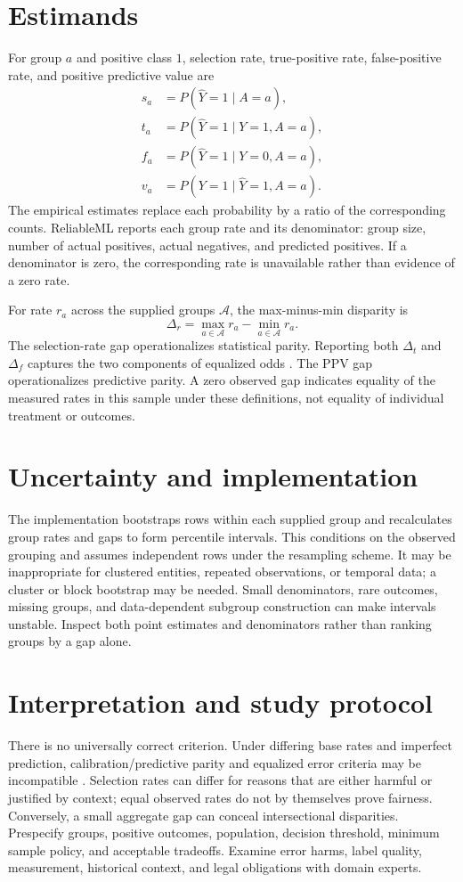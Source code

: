 \documentclass[conference]{IEEEtran}
\begin{document}
\section{Estimands}
For group \(a\) and positive class \(1\), selection rate, true-positive rate, false-positive rate, and positive predictive value are
\[
\begin{aligned}
s_a&=P(\widehat Y=1\mid A=a),\\
t_a&=P(\widehat Y=1\mid Y=1,A=a),\\
f_a&=P(\widehat Y=1\mid Y=0,A=a),\\
v_a&=P(Y=1\mid\widehat Y=1,A=a).
\end{aligned}
\]
The empirical estimates replace each probability by a ratio of the corresponding counts. ReliableML reports each group rate and its denominator: group size, number of actual positives, actual negatives, and predicted positives. If a denominator is zero, the corresponding rate is unavailable rather than evidence of a zero rate.

For rate \(r_a\) across the supplied groups \(\mathcal A\), the max-minus-min disparity is
\[
\Delta_r=\max_{a\in\mathcal A}r_a-\min_{a\in\mathcal A}r_a.
\]
The selection-rate gap operationalizes statistical parity. Reporting both \(\Delta_t\) and \(\Delta_f\) captures the two components of equalized odds \cite{hardt2016}. The PPV gap operationalizes predictive parity. A zero observed gap indicates equality of the measured rates in this sample under these definitions, not equality of individual treatment or outcomes.

\section{Uncertainty and implementation}
The implementation bootstraps rows within each supplied group and recalculates group rates and gaps to form percentile intervals. This conditions on the observed grouping and assumes independent rows under the resampling scheme. It may be inappropriate for clustered entities, repeated observations, or temporal data; a cluster or block bootstrap may be needed. Small denominators, rare outcomes, missing groups, and data-dependent subgroup construction can make intervals unstable. Inspect both point estimates and denominators rather than ranking groups by a gap alone.

\section{Interpretation and study protocol}
There is no universally correct criterion. Under differing base rates and imperfect prediction, calibration/predictive parity and equalized error criteria may be incompatible \cite{chouldechova2017}. Selection rates can differ for reasons that are either harmful or justified by context; equal observed rates do not by themselves prove fairness. Conversely, a small aggregate gap can conceal intersectional disparities. Prespecify groups, positive outcomes, population, decision threshold, minimum sample policy, and acceptable tradeoffs. Examine error harms, label quality, measurement, historical context, and legal obligations with domain experts.
\end{document}

